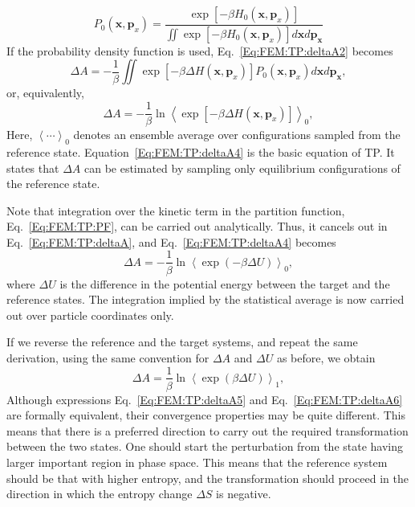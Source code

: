 \begin{equation}
P_{0}(\mathbf{x},\mathbf{p}_{x}) = \frac{ \exp[-\beta H_{0}(\mathbf{x},\mathbf{p}_{x}) ] }{\iint \exp[-\beta H_{0}(\mathbf{x},\mathbf{p}_{x}) ] d\mathbf{x}d\mathbf{p}_\mathbf{x}}
\label{Eq:FEM:TP:proden}
\end{equation}
If the probability density function is used, Eq.~\ref{Eq:FEM:TP:deltaA2} becomes
\begin{equation}
\Delta A = -\frac{1}{\beta} \iint \exp[-\beta \Delta H(\mathbf{x},\mathbf{p}_{x})] P_{0}(\mathbf{x},\mathbf{p}_{x}) d\mathbf{x}d\mathbf{p}_\mathbf{x},
\label{Eq:FEM:TP:deltaA3}
\end{equation}
or, equivalently,
\begin{equation}
\Delta A = -\frac{1}{\beta} \ln{ \left \langle \exp[-\beta \Delta H(\mathbf{x},\mathbf{p}_{x})] \right \rangle_{0}},
\label{Eq:FEM:TP:deltaA4}
\end{equation}
Here, $\left \langle \cdots \right \rangle _{0}$ denotes an ensemble average over configurations sampled from the reference state. Equation~\ref{Eq:FEM:TP:deltaA4} is the basic equation of TP. It states that $\Delta A$ can be estimated by sampling only equilibrium configurations of the reference state.

Note that integration over the kinetic term in the partition function, Eq.~\ref{Eq:FEM:TP:PF}, can be carried out analytically. Thus, it cancels out in Eq.~\ref{Eq:FEM:TP:deltaA}, and Eq.~\ref{Eq:FEM:TP:deltaA4} becomes
\begin{equation}
\Delta A = -\frac{1}{\beta} \ln{\left< \exp(-\beta \Delta U) \right>_{0}},
\label{Eq:FEM:TP:deltaA5}
\end{equation}
where $\Delta U$ is the difference in the potential energy between the target and the reference states. The integration implied by the statistical average is now carried out over particle coordinates only.

If we reverse the reference and the target systems, and repeat the same derivation, using the same convention for  $\Delta A$ and $\Delta U$ as before, we obtain
\begin{equation}
\Delta A = \frac{1}{\beta} \ln{ \left \langle \exp(\beta \Delta U) \right \rangle_{1}},
\label{Eq:FEM:TP:deltaA6}
\end{equation}
Although expressions Eq.~\ref{Eq:FEM:TP:deltaA5} and Eq.~\ref{Eq:FEM:TP:deltaA6} are formally equivalent, their convergence properties may be quite different. This means that there is a preferred direction to carry out the required transformation between the two states. One should start the perturbation from the state having larger important region in phase space. This means that the reference system should be that with higher entropy, and the transformation should proceed in the direction in which the entropy change $\Delta S$ is negative. 

